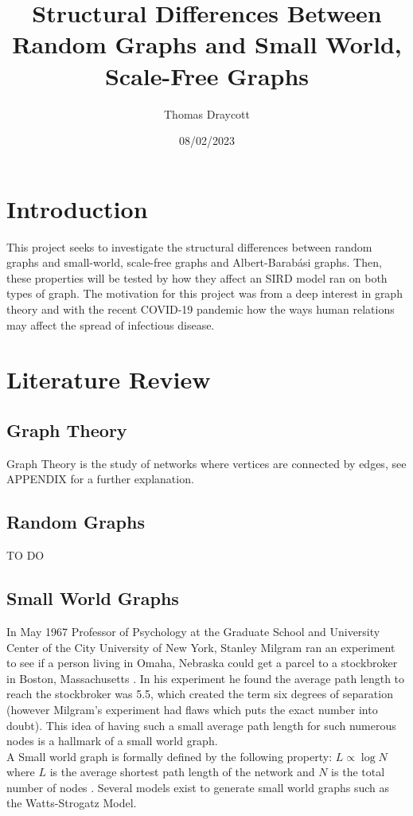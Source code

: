 \documentclass{article}
\title{Structural Differences Between Random Graphs and Small World, Scale-Free Graphs }
\date{08/02/2023}
\author{Thomas Draycott}
\begin{document}
    \maketitle
    \newpage
    \tableofcontents
    \newpage
    \section{Introduction}
    This project seeks to investigate the structural differences between random graphs and small-world, scale-free graphs and Albert-Barabási graphs. Then, these properties will be tested by how they affect an SIRD model ran on both types of graph. The motivation for this project was from a deep interest in graph theory and with the recent COVID-19 pandemic how the ways human relations may affect the spread of infectious disease.
    \section{Literature Review}
        \subsection{Graph Theory}
        Graph Theory is the study of networks where vertices are connected by edges, see APPENDIX for a further explanation.
        \subsection{Random Graphs}
        TO DO
        \subsection{Small World Graphs}
        In May 1967 Professor of Psychology at the Graduate School and University Center of the City University of New York, Stanley Milgram ran an experiment to see if a person living
        in Omaha, Nebraska could get a parcel to a stockbroker in Boston, Massachusetts \parencite{milgram1967small}. In his experiment he found the average path length to reach the stockbroker was 5.5, which created the term
        six degrees of separation (however Milgram's experiment had flaws which puts the exact number into doubt). This idea of having such a small average path length for such numerous nodes is a hallmark of a small world graph.\\
        A Small world graph is formally defined by the following property: $L\propto\log{N}$ where $L$ is the average shortest path length of the network and $N$ is the total number of nodes \parencite{Watts1998}. Several models exist to generate small world graphs such as the Watts-Strogatz Model.
\end{document}
